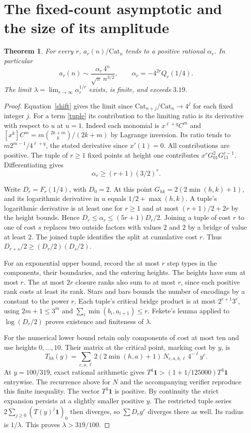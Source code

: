 \documentclass[11pt,letterpaper]{article}
\newtheorem{theorem}{Theorem}
\newcommand{\Cat}{\mathrm{Cat}}
\begin{document}
\section{The fixed-count asymptotic and the size of its amplitude}
\begin{theorem}\label{amplitude}
For every $r$, $a_r(n)/\Cat_n$ tends to a positive rational $\alpha_r$. In particular
\[
 a_r(n)\sim\frac{\alpha_r\,4^n}{\sqrt{\pi}\,n^{3/2}},\qquad
 \alpha_r=-4^{2r}Q_r(1/4).
\]
The limit $\lambda=\lim_{r\to\infty}\alpha_r^{1/r}$ exists, is finite, and exceeds $3.19$.
\end{theorem}
\begin{proof}
Equation~\eqref{shift} gives the limit since $\Cat_{n+j}/\Cat_n\to4^j$ for each fixed integer $j$. For a term \eqref{tuple} its contribution to the limiting ratio is its derivative with respect to $u$ at $u=1$. Indeed each monomial is $x^{\ell+q}C^m$ and
$[x^k]C^m=m\binom{2k+m}{k}/(2k+m)$ by Lagrange inversion. Its ratio tends to $m2^{m-1}/4^{\ell+q}$, the stated derivative since $x'(1)=0$. All contributions are positive. The tuple of $r\ge1$ fixed points at height one contributes $x^rG_{01}^2G_{11}^{r-1}$. Differentiating gives
\begin{equation}
 \alpha_r\ge(r+1)(3/2)^r. \label{lower}
\end{equation}

Write $D_r=F_r(1/4)$, with $D_0=2$. At this point $G_{hk}=2(2\min(h,k)+1)$, and its logarithmic derivative in $u$ equals $1/2+\max(h,k)$. A tuple's logarithmic derivative is at least one for $r\ge1$ and at most $(r+1)/2+2r$ by the height bounds. Hence
$D_r\le\alpha_r\le (5r+1)D_r/2$.
Joining a tuple of cost $r$ to one of cost $s$ replaces two outside factors with values $2$ and $2$ by a bridge of value at least $2$. The joined tuple identifies the split at cumulative cost $r$. Thus $D_{r+s}/2\ge(D_r/2)(D_s/2)$.

For an exponential upper bound, record the at most $r$ step types in the components, their boundaries, and the entering heights. The heights have sum at most $r$. The at most $2r$ closure ranks also sum to at most $r$, since each positive rank costs at least its rank. Stars and bars bounds the number of encodings by a constant to the power $r$. Each tuple's critical bridge product is at most $2^{r+1}3^r$, using $2m+1\le3^m$ and $\sum_i\min(b_i,a_{i+1})\le r$. Fekete's lemma applied to $\log(D_r/2)$ proves existence and finiteness of $\lambda$.

For the numerical lower bound retain only components of cost at most ten and use heights $0,\ldots,10$. Their matrix at the critical point, marking cost by $y$, is
\[
 T_{hb}(y)=\sum_{c,a,\ell}2(2\min(h,a)+1)\,N_{c,a,b,\ell}\,4^{-\ell}y^c .
\]
At $y=100/319$, exact rational arithmetic gives $T^4\mathbf1>(1+1/125000)T^3\mathbf1$ entrywise. The recurrence above for $N$ and the accompanying verifier reproduce this finite inequality. The vector $T^3\mathbf1$ is positive. By continuity the strict expansion persists at a slightly smaller positive $y$. The restricted tuple series $2\sum_{j\ge0}(T(y)^j\mathbf1)_0$ then diverges, so $\sum D_ry^r$ diverges there as well. Its radius is $1/\lambda$. This proves $\lambda>319/100$.
\end{proof}
\end{document}
